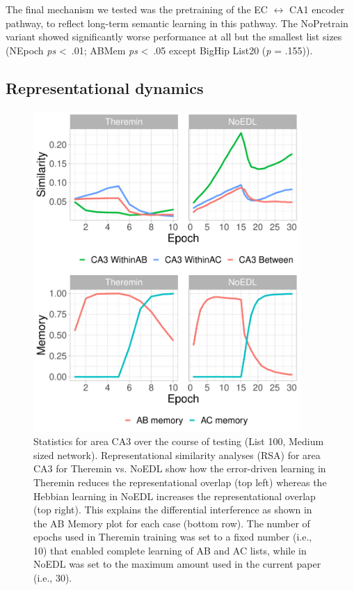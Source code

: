 \documentclass[11pt,twoside]{article}
\newif\myifpdf
\begin{document}
The final mechanism we tested was the pretraining of the EC $\leftrightarrow$ CA1 encoder pathway, to reflect long-term semantic learning in this pathway.  The NoPretrain variant showed significantly worse performance at all but the smallest list sizes (NEpoch \emph{ps} \textless \ .01; ABMem \emph{ps} \textless \ .05 except BigHip List20 (\emph{p} = .155)). 

\subsection{Representational dynamics}

\begin{figure}
  \centering\includegraphics[width=4in]{fig_hip_edl_test_stats}
  \caption{\footnotesize Statistics for area CA3 over the course of testing (List 100, Medium sized network). Representational similarity analyses (RSA) for area CA3 for Theremin vs. NoEDL show how the error-driven learning in Theremin reduces the representational overlap (top left) whereas the Hebbian learning in NoEDL increases the representational overlap (top right).  This explains the differential interference as shown in the AB Memory plot for each case (bottom row). The number of epochs used in Theremin training was set to a fixed number (i.e., 10) that enabled complete learning of AB and AC lists, while in NoEDL was set to the maximum amount used in the current paper (i.e., 30).}
\label{fig.test_stats}
\end{figure}
\end{document}
